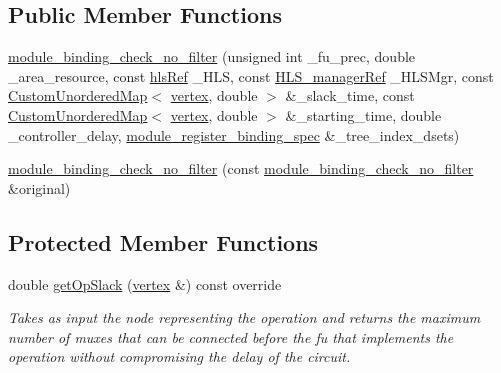 \subsection*{Public Member Functions}
\begin{DoxyCompactItemize}
\item 
\hyperlink{structmodule__binding__check__no__filter_ad87dae8bcbf3d5e2916eae22292ffe73}{module\+\_\+binding\+\_\+check\+\_\+no\+\_\+filter} (unsigned int \+\_\+fu\+\_\+prec, double \+\_\+area\+\_\+resource, const \hyperlink{hls_8hpp_a75d0c73923d0ddfa28c4843a802c73a7}{hls\+Ref} \+\_\+\+H\+LS, const \hyperlink{hls__manager_8hpp_acd3842b8589fe52c08fc0b2fcc813bfe}{H\+L\+S\+\_\+manager\+Ref} \+\_\+\+H\+L\+S\+Mgr, const \hyperlink{custom__map_8hpp_ad1ed68f2ff093683ab1a33522b144adc}{Custom\+Unordered\+Map}$<$ \hyperlink{graph_8hpp_abefdcf0544e601805af44eca032cca14}{vertex}, double $>$ \&\+\_\+slack\+\_\+time, const \hyperlink{custom__map_8hpp_ad1ed68f2ff093683ab1a33522b144adc}{Custom\+Unordered\+Map}$<$ \hyperlink{graph_8hpp_abefdcf0544e601805af44eca032cca14}{vertex}, double $>$ \&\+\_\+starting\+\_\+time, double \+\_\+controller\+\_\+delay, \hyperlink{classmodule__register__binding__spec}{module\+\_\+register\+\_\+binding\+\_\+spec} \&\+\_\+tree\+\_\+index\+\_\+dsets)
\item 
\hyperlink{structmodule__binding__check__no__filter_abbcb52f5640574e625745906f6c03f07}{module\+\_\+binding\+\_\+check\+\_\+no\+\_\+filter} (const \hyperlink{structmodule__binding__check__no__filter}{module\+\_\+binding\+\_\+check\+\_\+no\+\_\+filter} \&original)
\end{DoxyCompactItemize}
\subsection*{Protected Member Functions}
\begin{DoxyCompactItemize}
\item 
double \hyperlink{structmodule__binding__check__no__filter_a13a56954ea41ba112ee9d4ad3f709ed8}{get\+Op\+Slack} (\hyperlink{graph_8hpp_abefdcf0544e601805af44eca032cca14}{vertex} \&) const override
\begin{DoxyCompactList}\small\item\em Takes as input the node representing the operation and returns the maximum number of muxes that can be connected before the fu that implements the operation without compromising the delay of the circuit. \end{DoxyCompactList}\end{DoxyCompactItemize}
